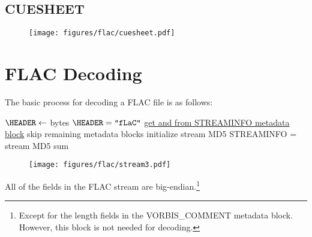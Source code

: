 \clearpage

\subsection{CUESHEET}
\begin{figure}[h]
  \texttt{[image: figures/flac/cuesheet.pdf]}
\end{figure}

\clearpage

\section{FLAC Decoding}

The basic process for decoding a FLAC file is as follows:
\par
\noindent
{}
$\HEADER \leftarrow$  bytes\;
\ASSERT $\text{\HEADER} = \texttt{"fLaC"}$\;
\hyperref[flac:read_metadata]{get \PCMCOUNT and \MDSUM from STREAMINFO metadata block}\;
skip remaining metadata blocks\;
initialize stream MD5\;
\ASSERT STREAMINFO \MDSUM = stream MD5 sum
\EALGORITHM
\begin{figure}[h]
\texttt{[image: figures/flac/stream3.pdf]}
\end{figure}
\par
All of the fields in the FLAC stream are big-endian.\footnote{Except
for the length fields in the VORBIS\_COMMENT metadata block.
However, this block is not needed for decoding.
}

\clearpage

